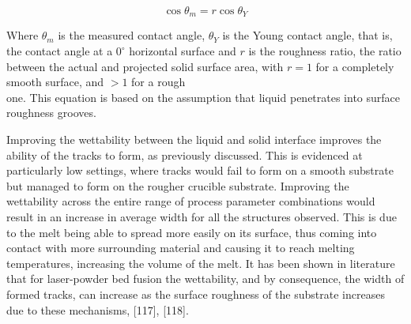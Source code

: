 \documentclass[10pt]{article}
\begin{document}
\begin{equation*}
\cos \theta_{m}=r \cos \theta_{Y} \tag{10}
\end{equation*}


Where $\theta_{m}$ is the measured contact angle, $\theta_{Y}$ is the Young contact angle, that is, the contact angle at a $0^{\circ}$ horizontal surface and $r$ is the roughness ratio, the ratio between the actual and projected solid surface area, with $r=1$ for a completely smooth surface, and $>1$ for a rough\\
one. This equation is based on the assumption that liquid penetrates into surface roughness grooves.

Improving the wettability between the liquid and solid interface improves the ability of the tracks to form, as previously discussed. This is evidenced at particularly low settings, where tracks would fail to form on a smooth substrate but managed to form on the rougher crucible substrate. Improving the wettability across the entire range of process parameter combinations would result in an increase in average width for all the structures observed. This is due to the melt being able to spread more easily on its surface, thus coming into contact with more surrounding material and causing it to reach melting temperatures, increasing the volume of the melt. It has been shown in literature that for laser-powder bed fusion the wettability, and by consequence, the width of formed tracks, can increase as the surface roughness of the substrate increases due to these mechanisms, [117], [118].
\end{document}
